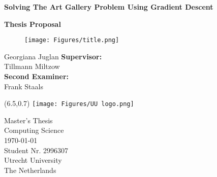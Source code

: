 \documentclass{article}
\begin{document}

\thispagestyle{empty} 
\begin{center}
    \vspace*{0.5cm}
    \huge
    \textbf{Solving The Art Gallery Problem Using Gradient Descent}

    \vspace*{0.4cm}
    \LARGE
    \textbf{Thesis Proposal}
    \vspace*{2cm}

    \begin{figure}[H]
        \centering   
        \texttt{[image: Figures/title.png]}
    \end{figure}


    \vspace{-1cm}
    \LARGE
    Georgiana Juglan
    \vfill 
    \large    
    \textbf{Supervisor:} \\
    Tillmann Miltzow \\
    \textbf{Second Examiner:} \\
    Frank Staals \\
     
\end{center}
   

\begin{textblock}{3}(6.5,0.7)
\texttt{[image: Figures/UU logo.png]}
\end{textblock}

\begin{flushleft}
    \vspace{0.5cm}
    Master's Thesis \\
    Computing Science\\
    \today\\
    Student Nr. 2996307 \\
    Utrecht University\\
    The Netherlands
\end{flushleft}

\newpage
\thispagestyle{empty}

\thispagestyle{empty}
\tableofcontents
\thispagestyle{empty}






% 
% 
% 
\printbibliography

\renewcommand{\headrulewidth}{0pt}%
\fancyhead{}%

% 

%
\end{document}

